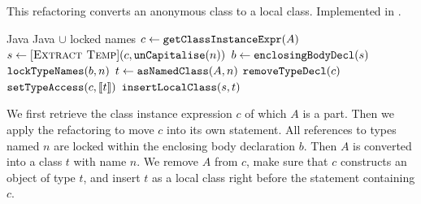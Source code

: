 \subsection{}
This refactoring converts an anonymous class to a local class. Implemented in .

\begin{algorithm}
\caption{$\refactoring{Convert Anonymous to Local}(A : \type{AnonymousClass}, n : \type{Name}) : \type{LocalClass}$}
\begin{algorithmic}[1]
\REQUIRE Java
\ENSURE Java $\cup$ locked names
\medskip
\STATE $c \leftarrow \text{\texttt{getClassInstanceExpr}}(A)$
\STATE $s \leftarrow [\textsc{Extract Temp}](c, \text{\texttt{unCapitalise}}(n))$
\STATE $b \leftarrow \text{\texttt{enclosingBodyDecl}}(s)$
\STATE $\text{\texttt{lockTypeNames}}(b, n)$
\STATE $t \leftarrow \text{\texttt{asNamedClass}}(A, n)$
\STATE $\text{\texttt{removeTypeDecl}}(c)$
\STATE $\text{\texttt{setTypeAccess}}(c, \llbracket t\rrbracket)$
\RETURN $\text{\texttt{insertLocalClass}}(s, t)$
\end{algorithmic}
\end{algorithm}

We first retrieve the class instance expression $c$ of which $A$ is a part. Then we apply the  refactoring to move $c$ into its own statement. All references to types named $n$ are locked within the enclosing body declaration $b$. Then $A$ is converted into a class $t$ with name $n$. We remove $A$ from $c$, make sure that $c$ constructs an object of type $t$, and insert $t$ as a local class right before the statement containing $c$.
